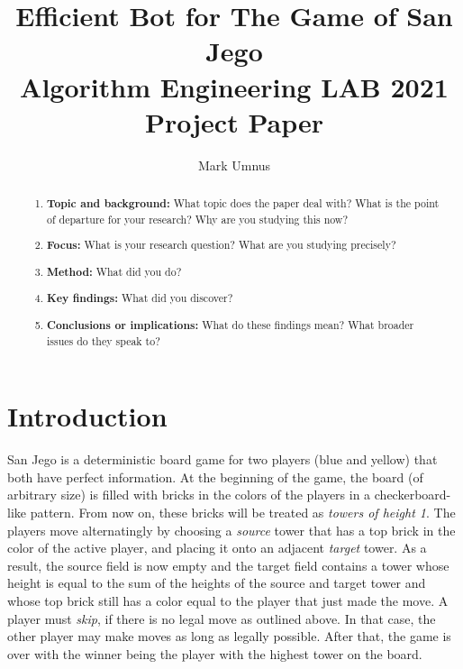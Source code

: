 \documentclass[sigconf]{acmart}
\begin{document}
\title[San Jego]{Efficient Bot for The Game of San Jego\\\large Algorithm Engineering LAB 2021 Project Paper}

\author{Mark Umnus}

\begin{abstract}

\begin{enumerate}
\item \textbf{Topic and background:} What topic does the paper deal with? What is the point of departure for your research? Why are you studying this now?
\item \textbf{Focus:} What is your research question? What are you studying precisely?
\item \textbf{Method:} What did you do?
\item \textbf{Key findings:} What did you discover?
\item \textbf{Conclusions or implications:} What do these findings mean? What broader issues do they speak to?
\end{enumerate}


\end{abstract}


\maketitle

\let\thefootnote\relax{}


\section{Introduction}

San Jego is a deterministic board game for two players (blue and yellow) that both have perfect information.
At the beginning of the game, the board (of arbitrary size) is filled with bricks in the colors of the players in a checkerboard-like pattern.
From now on, these bricks will be treated as \emph{towers of height 1}.
The players move alternatingly by choosing a \emph{source} tower that has a top brick in the color of the active player, and placing it onto an adjacent \emph{target} tower.
As a result, the source field is now empty and the target field contains a tower whose height is equal to the sum of the heights of the source and target tower and whose top brick still has a color equal to the player that just made the move.
A player must \emph{skip}, if there is no legal move as outlined above.
In that case, the other player may make moves as long as legally possible.
After that, the game is over with the winner being the player with the highest tower on the board.
\end{document}
